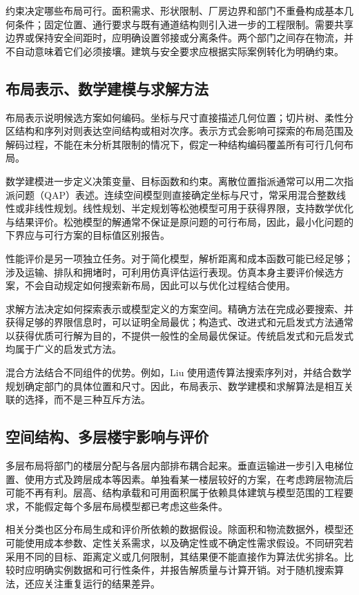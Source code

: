 \documentclass[UTF8,zihao=5,a4paper,fontset=fandol]{ctexart}
\begin{document}
约束决定哪些布局可行。面积需求、形状限制、厂房边界和部门不重叠构成基本几何条件；固定位置、通行要求与既有通道结构则引入进一步的工程限制\cite{anjos2017,liu2004}。需要共享边界或保持安全间距时，应明确设置邻接或分离条件。两个部门之间存在物流，并不自动意味着它们必须接壤。建筑与安全要求应根据实际案例转化为明确约束。

\subsection{布局表示、数学建模与求解方法}
布局表示说明候选方案如何编码。坐标与尺寸直接描述几何位置；切片树、柔性分区结构和序列对则表达空间结构或相对次序\cite{anjos2017,liu2004}。表示方式会影响可探索的布局范围及解码过程，不能在未分析其限制的情况下，假定一种结构编码覆盖所有可行几何布局。

数学建模进一步定义决策变量、目标函数和约束。离散位置指派通常可以用二次指派问题（QAP）表述。连续空间模型则直接确定坐标与尺寸，常采用混合整数线性或非线性规划。线性规划、半定规划等松弛模型可用于获得界限，支持数学优化与结果评价\cite{anjos2017}。松弛模型的解通常不保证是原问题的可行布局，因此，最小化问题的下界应与可行方案的目标值区别报告。

性能评价是另一项独立任务。对于简化模型，解析距离和成本函数可能已经足够；涉及运输、排队和拥堵时，可利用仿真评估运行表现\cite{perez2021,ahmadi2017}。仿真本身主要评价候选方案，不会自动规定如何搜索新布局，因此可以与优化过程结合使用。

求解方法决定如何探索表示或模型定义的方案空间。精确方法在完成必要搜索、并获得足够的界限信息时，可以证明全局最优；构造式、改进式和元启发式方法通常以获得优质可行解为目的，不提供一般性的全局最优保证\cite{drira2007}。传统启发式和元启发式均属于广义的启发式方法。

混合方法结合不同组件的优势。例如，Liu 使用遗传算法搜索序列对，并结合数学规划确定部门的具体位置和尺寸\cite{liu2004}。因此，布局表示、数学建模和求解算法是相互关联的选择，而不是三种互斥方法。

\subsection{空间结构、多层楼宇影响与评价}
多层布局将部门的楼层分配与各层内部排布耦合起来。垂直运输进一步引入电梯位置、使用方式及跨层成本等因素\cite{ahmadi2017}。单独看某一楼层较好的方案，在考虑跨层物流后可能不再有利。层高、结构承载和可用面积属于依赖具体建筑与模型范围的工程要求，不能假定每个多层布局模型都已考虑这些条件。

相关分类也区分布局生成和评价所依赖的数据假设\cite{drira2007,perez2021}。除面积和物流数据外，模型还可能使用成本参数、定性关系需求，以及确定性或不确定性需求假设。不同研究若采用不同的目标、距离定义或几何限制，其结果便不能直接作为算法优劣排名。比较时应明确实例数据和可行性条件，并报告解质量与计算开销。对于随机搜索算法，还应关注重复运行的结果差异。
\end{document}
